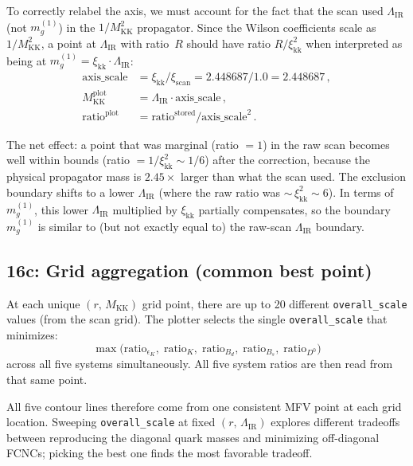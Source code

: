 \documentclass[11pt]{article}
\newcommand{\Mkk}{M_{\mathrm{KK}}}
\newcommand{\LamIR}{\Lambda_{\mathrm{IR}}}
\begin{document}
To correctly relabel the axis, we must account for the fact that the scan used
$\LamIR$ (not $m_g^{(1)}$) in the $1/\Mkk^2$ propagator.  Since the Wilson
coefficients scale as $1/\Mkk^2$, a point at $\LamIR$ with ratio~$R$ should
have ratio $R/\xi_{\mathrm{kk}}^2$ when interpreted as being at
$m_g^{(1)} = \xi_{\mathrm{kk}}\cdot\LamIR$:
\begin{align}
  \text{axis\_scale} &= \xi_{\mathrm{kk}} / \xi_{\mathrm{scan}}
    = 2.448687 / 1.0 = 2.448687\,, \\
  \Mkk^{\mathrm{plot}} &= \LamIR \cdot \text{axis\_scale}\,, \\
  \text{ratio}^{\mathrm{plot}} &= \text{ratio}^{\mathrm{stored}} /
    \text{axis\_scale}^2\,.
\end{align}

The net effect: a point that was marginal (ratio $= 1$) in the raw scan becomes
well within bounds (ratio $= 1/\xi_{\mathrm{kk}}^2 \sim 1/6$) after the
correction, because the physical propagator mass is $2.45\times$ larger than
what the scan used.  The exclusion boundary shifts to a lower $\LamIR$ (where
the raw ratio was ${\sim}\,\xi_{\mathrm{kk}}^2 \sim 6$).  In terms of
$m_g^{(1)}$, this lower $\LamIR$ multiplied by $\xi_{\mathrm{kk}}$ partially
compensates, so the boundary $m_g^{(1)}$ is similar to (but not exactly equal
to) the raw-scan $\LamIR$ boundary.

\subsection{16c: Grid aggregation (common best point)}
\label{sec:step16c}

At each unique $(r,\,\Mkk)$ grid point, there are up to 20 different
\texttt{overall\_scale} values (from the scan grid).  The plotter selects the
single \texttt{overall\_scale} that minimizes:
\begin{equation}
  \max\!\bigl(\text{ratio}_{\epsilon_K},\;\text{ratio}_K,\;
    \text{ratio}_{B_d},\;\text{ratio}_{B_s},\;\text{ratio}_{D^0}\bigr)
\end{equation}
across all five systems simultaneously.  All five system ratios are then read
from that same point.

All five contour lines therefore come from one consistent MFV point at each
grid location.  Sweeping \texttt{overall\_scale} at fixed $(r,\,\LamIR)$
explores different tradeoffs between reproducing the diagonal quark masses and
minimizing off-diagonal FCNCs; picking the best one finds the most favorable
tradeoff.
\end{document}
